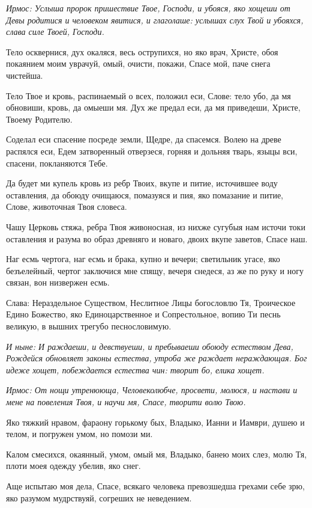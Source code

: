 \itshape Ирмос\normalfont{}: Услыша пророк пришествие Твое, Господи, и убояся, яко хощеши от Девы родитися и человеком явитися, и глаголаше: услышах слух Твой и убояхся, слава силе Твоей, Господи. 

Тело осквернися, дух окаляся, весь острупихся, но яко врач, Христе, обоя покаянием моим уврачуй, омый, очисти, покажи, Спасе мой, паче снега чистейша. 

Тело Твое и кровь, распинаемый о всех, положил еси, Слове: тело убо, да мя обновиши, кровь, да омыеши мя. Дух же предал еси, да мя приведеши, Христе, Твоему Родителю. 

Соделал еси спасение посреде земли, Щедре, да спасемся. Волею на древе распялся еси, Едем затворенный отверзеся, горняя и дольняя тварь, языцы вси, спасени, покланяются Тебе. 

Да будет ми купель кровь из ребр Твоих, вкупе и питие, источившее воду оставления, да обоюду очищаюся, помазуяся и пия, яко помазание и питие, Слове, животочная Твоя словеса. 

Чашу Церковь стяжа, ребра Твоя живоносная, из нихже сугубыя нам источи токи оставления и разума во образ древняго и новаго, двоих вкупе заветов, Спасе наш. 

Наг есмь чертога, наг есмь и брака, купно и вечери; светильник угасе, яко безъелейный, чертог заключися мне спящу, вечеря снедеся, аз же по руку и ногу связан, вон низвержен есмь. 

Слава: Нераздельное Существом, Неслитное Лицы богословлю Тя, Троическое Едино Божество, яко Единоцарственное и Сопрестольное, вопию Ти песнь великую, в вышних трегубо песнословимую. 

\itshape И ныне\normalfont{}: И раждаеши, и девствуеши, и пребываеши обоюду естеством Дева, Рождейся обновляет законы естества, утроба же раждает нераждающая. Бог идеже хощет, побеждается естества чин: творит бо, елика хощет. 


\itshape Ирмос\normalfont{}: От нощи утренююща, Человеколюбче, просвети, молюся, и настави и мене на повеления Твоя, и научи мя, Спасе, творити волю Твою. 

Яко тяжкий нравом, фараону горькому бых, Владыко, Ианни и Иамври, душею и телом, и погружен умом, но помози ми. 

Калом смесихся, окаянный, умом, омый мя, Владыко, банею моих слез, молю Тя, плоти моея одежду убелив, яко снег. 

Аще испытаю моя дела, Спасе, всякаго человека превозшедша грехами себе зрю, яко разумом мудрствуяй, согреших не неведением. 


